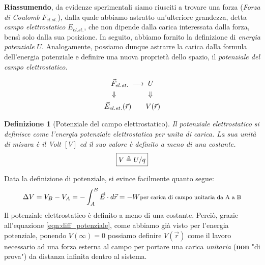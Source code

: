 \documentclass[a4paper,12pt,titlepage,openany]{book}
\theoremstyle{mydef}
\newtheorem{definizione}{Definizione}[chapter]
\begin{document}
            \bigskip
            \textbf{Riassumendo}, da evidenze sperimentali siamo riusciti a trovare una forza (\emph{Forza di Coulomb} $F_{el.st.}$), dalla quale abbiamo astratto
            un'ulteriore grandezza, detta \emph{campo elettrostatico} $E_{el.st.}$, che non dipende dalla carica interessata dalla forza, bensì solo dalla
            sua posizione. In seguito, abbiamo fornito la definizione di \emph{energia potenziale} $U$. Analogamente, possiamo dunque astrarre la carica
            dalla formula dell'energia potenziale e definire una nuova proprietà dello spazio, il \emph{potenziale del campo elettrostatico}.
            
            
            \begin{gather*}
                \vec{F}_{el.st.} \;\longrightarrow\; U\\
                \Downarrow \hspace{4.5em} \Downarrow\\
                \vec{E}_{el.st.}(\vec{r}) \qquad V(\vec{r})
            \end{gather*}
            
            
            \begin{definizione}[Potenziale del campo elettrostatico]
                Il potenziale elettrostatico si definisce come l'energia potenziale elettrostatica per unita di carica.
                La sua unità di misura è il \emph{Volt} $[V]$ ed il suo valore è definito a meno di una costante.
                \begin{equation}
                \boxed{V\triangleq U/q}\\
                \end{equation}
            \end{definizione}
            
            \noindent Data la definizione di potenziale, si evince facilmente quanto segue:
            \begin{equation}\label{eqn:diff_potenziale}
                \Delta V = V_B - V_A = -\int_A^B \vec{E}\cdot d\vec{r} = -W
                \mbox{\footnotesize per carica di campo unitaria da A a B}
            \end{equation}
            Il potenziale elettrostatico è definito a meno di una costante. Perciò, grazie all'equazione
            \ref{eqn:diff_potenziale}, come abbiamo già visto per l'energia potenziale, ponendo $V(\infty) = 0$
            possiamo definire $V(\vec{r})$ come il lavoro necessario ad una forza
            esterna al campo per portare una carica \emph{unitaria} (\textbf{non} "di prova") da distanza infinita dentro al sistema.
            
\end{document}
